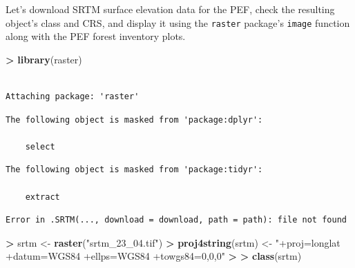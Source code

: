 \documentclass[]{krantz}
\makeatletter
\newenvironment{Shaded}{\begin{snugshade}}{\end{snugshade}}
\newcommand{\KeywordTok}[1]{\textcolor[rgb]{0.27,0.27,0.27}{\textbf{#1}}}
\newcommand{\DataTypeTok}[1]{\textcolor[rgb]{0.27,0.27,0.27}{#1}}
\newcommand{\DecValTok}[1]{\textcolor[rgb]{0.06,0.06,0.06}{#1}}
\newcommand{\StringTok}[1]{\textcolor[rgb]{0.5,0.5,0.5}{#1}}
\newcommand{\OperatorTok}[1]{\textcolor[rgb]{0.43,0.43,0.43}{\textbf{#1}}}
\newcommand{\ErrorTok}[1]{\textcolor[rgb]{0.14,0.14,0.14}{\textbf{#1}}}
\newcommand{\NormalTok}[1]{#1}
\newenvironment{kframe}{%
\medskip{}
\setlength{\fboxsep}{.8em}
 \def\at@end@of@kframe{}%
 \ifinner\ifhmode%
  \def\at@end@of@kframe{\end{minipage}}%
  \begin{minipage}{\columnwidth}%
 \fi\fi%
 \def\FrameCommand##1{\hskip\@totalleftmargin \hskip-\fboxsep
 \colorbox{shadecolor}{##1}\hskip-\fboxsep
     \hskip-\linewidth \hskip-\@totalleftmargin \hskip\columnwidth}%
 \MakeFramed {\advance\hsize-\width
   \@totalleftmargin\z@ \linewidth\hsize
   \@setminipage}}%
 {\par\unskip\endMakeFramed%
 \at@end@of@kframe}
\renewenvironment{Shaded}{\begin{kframe}}{\end{kframe}}
\theoremstyle{definition}
\theoremstyle{definition}
\theoremstyle{definition}
\theoremstyle{remark}
\makeatother
\begin{document}
Let's download SRTM surface elevation data for the PEF, check the
resulting object's class and CRS, and display it using the
\texttt{raster} package's \texttt{image} function along with the PEF
forest inventory plots.

\begin{Shaded}
\begin{Highlighting}[]
\OperatorTok{>}\StringTok{ }\KeywordTok{library}\NormalTok{(raster)}
\end{Highlighting}
\end{Shaded}

\begin{verbatim}

Attaching package: 'raster'
\end{verbatim}

\begin{verbatim}
The following object is masked from 'package:dplyr':

    select
\end{verbatim}

\begin{verbatim}
The following object is masked from 'package:tidyr':

    extract
\end{verbatim}

\begin{Shaded}
\end{Shaded}

\begin{verbatim}
Error in .SRTM(..., download = download, path = path): file not found
\end{verbatim}

\begin{Shaded}
\begin{Highlighting}[]
\OperatorTok{>}\StringTok{ }\NormalTok{srtm <-}\StringTok{ }\KeywordTok{raster}\NormalTok{(}\StringTok{"srtm_23_04.tif"}\NormalTok{)}
\OperatorTok{>}\StringTok{ }\KeywordTok{proj4string}\NormalTok{(srtm) <-}\StringTok{ "+proj=longlat +datum=WGS84 +ellps=WGS84 +towgs84=0,0,0"}
\OperatorTok{>}\StringTok{ }
\ErrorTok{>}\StringTok{ }\KeywordTok{class}\NormalTok{(srtm)}
\end{Highlighting}
\end{Shaded}
\end{document}
